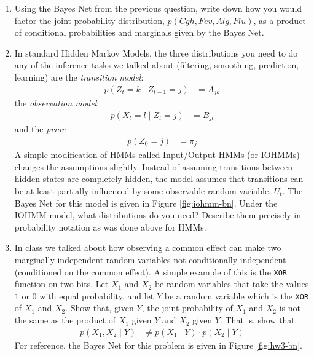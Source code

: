\documentclass{article}
\begin{document}
\begin{enumerate}
\begin{enumerate}
		\item Using the Bayes Net from the previous question, write down how you would factor the joint probability distribution, \(p(Cgh,Fev,Alg,Flu)\), as a product of conditional probabilities and marginals given by the Bayes Net.
		\item In standard Hidden Markov Models, the three distributions you need to do any of the inference tasks we talked about (filtering, smoothing, prediction, learning) are the \emph{transition model}:
		\begin{align*}
			p(Z_t=k\mid Z_{t-1}=j) &= A_{jk}
		\end{align*}
		the \emph{observation model}:
		\begin{align*}
			p(X_t=l\mid Z_t =j) &= B_{jl}
		\end{align*}
		and the \emph{prior}:
		\begin{align*}
			p(Z_0=j) &= \pi_j
		\end{align*}
		A simple modification of HMMs called Input/Output HMMs (or IOHMMs) changes the assumptions slightly. Instead of assuming transitions between hidden states are completely hidden, the model assumes that transitions can be at least partially influenced by some observable random variable, \(U_t\). The Bayes Net for this model is given in Figure \ref{fig:iohmm-bn}. Under the IOHMM model, what distributions do you need? Describe them precisely in probability notation as was done above for HMMs.
		\item In class we talked about how observing a common effect can make two marginally independent random variables not conditionally independent (conditioned on the common effect). A simple example of this is the \texttt{XOR} function on two bits. Let \(X_1\) and \(X_2\) be random variables that take the values \(1\) or \(0\) with equal probability, and let \(Y\) be a random variable which is the \texttt{XOR} of \(X_1\) and \(X_2\). Show that, given \(Y\), the joint probability of \(X_1\) and \(X_2\) is not the same as the product of \(X_1\) given \(Y\) and \(X_2\) given \(Y\). That is, show that
		\begin{align*}
			p(X_1, X_2\mid Y) &\neq p(X_1\mid Y)\cdot p(X_2\mid Y)
		\end{align*} 
		For reference, the Bayes Net for this problem is given in Figure \ref{fig:hw3-bn}.
	\end{enumerate}
\end{enumerate}
\end{document}
